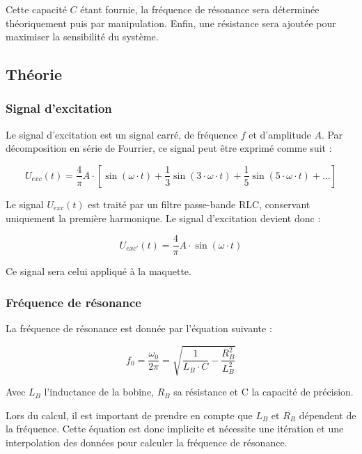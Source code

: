 Cette capacité $C$ étant fournie, la fréquence de résonance sera déterminée théoriquement puis par
manipulation. Enfin, une résistance sera ajoutée pour maximiser la sensibilité du système. 



\subsection{Théorie}
\subsubsection{Signal d'excitation}
Le signal d'excitation est un signal carré, de fréquence $f$ et d'amplitude $A$. Par décomposition
en série de Fourrier, ce signal peut être exprimé comme suit :

\begin{equation*}
U_{exc}(t) = \frac{4}{\pi} A \cdot [\sin(\omega \cdot t)+\frac{1}{3}\sin(3\cdot\omega \cdot t)+\frac{1}{5}\sin(5\cdot\omega \cdot t)+...]     
\end{equation*}
\vspace{0,2cm}

Le signal $U_{exc}(t)$ est traité par un filtre passe-bande RLC, conservant uniquement la première
harmonique. Le signal d'excitation devient donc :

\begin{equation*}
    U_{exc'}(t) = \frac{4}{\pi} A \cdot \sin(\omega \cdot t)
\end{equation*}

Ce signal sera celui appliqué à la maquette.

\subsubsection{Fréquence de résonance}

La fréquence de résonance est donnée par l'équation suivante :

\begin{equation*}
    f_0 = \frac{\omega_0}{2\pi} = \sqrt{\frac{1}{L_B\cdot C}-\frac{R_B^2}{L_B^2}}
\end{equation*}

Avec $L_B$ l'inductance de la bobine, $R_B$ sa résistance et C la capacité de précision.
\vspace{0,2cm}

Lors du calcul, il est important de prendre en compte que $L_B$ et $R_B$ dépendent de la fréquence.
Cette équation est donc implicite et nécessite une itération et une interpolation des données pour
calculer la fréquence de résonance.


